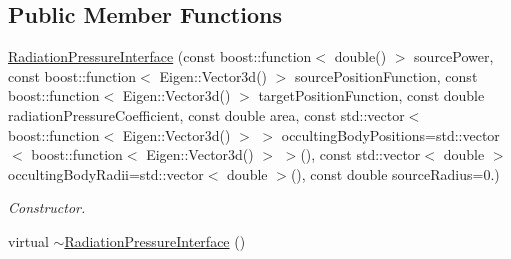\subsection*{Public Member Functions}
\begin{DoxyCompactItemize}
\item 
\hyperlink{classtudat_1_1electro__magnetism_1_1RadiationPressureInterface_a8948315705d771b072ddc84a745336cb}{Radiation\+Pressure\+Interface} (const boost\+::function$<$ double() $>$ source\+Power, const boost\+::function$<$ Eigen\+::\+Vector3d() $>$ source\+Position\+Function, const boost\+::function$<$ Eigen\+::\+Vector3d() $>$ target\+Position\+Function, const double radiation\+Pressure\+Coefficient, const double area, const std\+::vector$<$ boost\+::function$<$ Eigen\+::\+Vector3d() $>$ $>$ occulting\+Body\+Positions=std\+::vector$<$ boost\+::function$<$ Eigen\+::\+Vector3d() $>$ $>$(), const std\+::vector$<$ double $>$ occulting\+Body\+Radii=std\+::vector$<$ double $>$(), const double source\+Radius=0.)
\begin{DoxyCompactList}\small\item\em Constructor. \end{DoxyCompactList}\item 
virtual \hyperlink{classtudat_1_1electro__magnetism_1_1RadiationPressureInterface_afd8f599da3ee8096f5201aa19645149e}{$\sim$\+Radiation\+Pressure\+Interface} ()\hypertarget{classtudat_1_1electro__magnetism_1_1RadiationPressureInterface_afd8f599da3ee8096f5201aa19645149e}{}\label{classtudat_1_1electro__magnetism_1_1RadiationPressureInterface_afd8f599da3ee8096f5201aa19645149e}


\end{DoxyCompactItemize}

